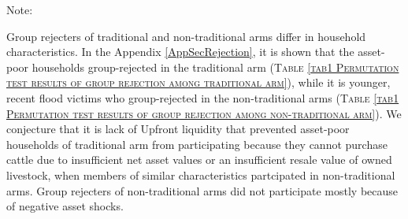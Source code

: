 \begin{table}
\hfil{\footnotesize Note:} 
\end{table}


	Group rejecters of \textsf{traditional} and non-\textsf{traditional} arms differ in household characteristics. In the Appendix \ref{AppSecRejection}, it is shown that the asset-poor households group-rejected in the \textsf{traditional} arm (\textsc{\normalsize Table \ref{tab1 Permutation test results of group rejection among traditional arm}}), while it is younger, recent flood victims who group-rejected in the non-\textsf{traditional} arms (\textsc{\normalsize Table \ref{tab1 Permutation test results of group rejection among non-traditional arm}}). We conjecture that it is lack of \textsf{Upfront} liquidity that prevented asset-poor households of \textsf{traditional} arm from participating because they cannot purchase cattle due to insufficient net asset values or an insufficient resale value of owned livestock, when members of similar characteristics partcipated in non-\textsf{traditional} arms. Group rejecters of non-\textsf{traditional} arms did not participate mostly because of negative asset shocks. %

